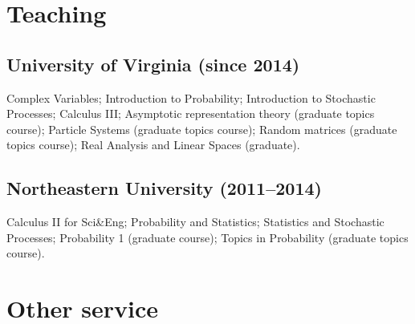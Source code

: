 \documentclass[letterpaper,11pt]{article}
\begin{document}
\section*{Teaching}

\subsection*{University of Virginia (since 2014)}

Complex Variables;
Introduction to Probability;
Introduction to Stochastic Processes;
Calculus III;
Asymptotic representation theory (graduate topics course);
Particle Systems (graduate topics course);
Random matrices (graduate topics course);
Real Analysis and Linear Spaces (graduate).

\subsection*{Northeastern University (2011--2014)}

Calculus II for Sci\&Eng;
Probability and Statistics;
Statistics and Stochastic Processes;
Probability 1 (graduate course);
Topics in Probability (graduate topics course).

\section*{Other service}
\end{document}
